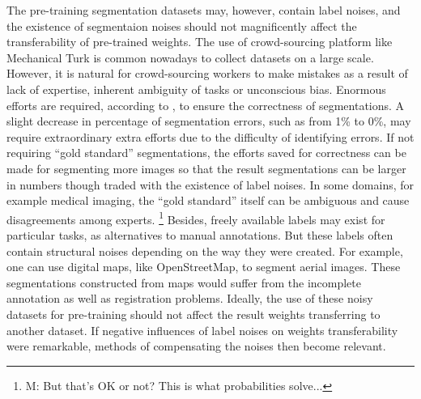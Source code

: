 

The pre-training segmentation datasets may, however, contain label noises, and the existence of segmentaion noises should not magnificently affect the transferability of pre-trained weights.
The use of crowd-sourcing platform like Mechanical Turk is common nowadays to collect datasets on a large scale.
However, it is natural for crowd-sourcing workers to make mistakes as a result of lack of expertise, inherent ambiguity of tasks or unconscious bias.
Enormous efforts are required, according to \cite{lin2014microsoft,everingham2015pascal}, to ensure the correctness of segmentations.
A slight decrease in percentage of segmentation errors, such as from 1\% to 0\%, may require extraordinary extra efforts due to the difficulty of identifying errors.
If not requiring ``gold standard'' segmentations, the efforts saved for correctness can be made for segmenting more images so that the result segmentations can be larger in numbers though traded with the existence of label noises.
In some domains, for example medical imaging, the ``gold standard'' itself can be ambiguous and cause disagreements among experts.
\footnote{M: But that's OK or not?  This is what probabilities solve...}
Besides, freely available labels may exist for particular tasks, as alternatives to manual annotations.
But these labels often contain structural noises depending on the way they were created.
For example, one can use digital maps, like OpenStreetMap, to segment aerial images.
These segmentations constructed from maps would suffer from the incomplete annotation as well as registration problems.\cite{mnih2012learning}
Ideally, the use of these noisy datasets for pre-training should not affect the result weights transferring to another dataset.
If negative influences of label noises on weights transferability were remarkable, methods of compensating the noises then become relevant.


